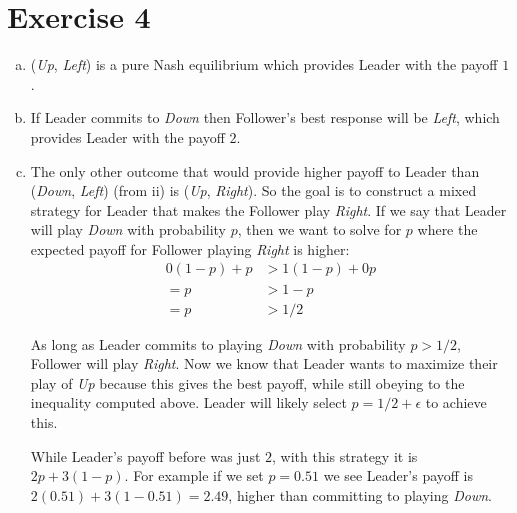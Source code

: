 \documentclass{article}
\begin{document}
\section*{Exercise 4}
\begin{enumerate}[a.]
    \item %
    (\emph{Up}, \emph{Left}) is a pure Nash equilibrium which provides Leader with the payoff $1$.

    \item %
    If Leader commits to \emph{Down} then Follower's best response will be \emph{Left}, which provides Leader with the payoff $2$.

    \item %
    The only other outcome that would provide higher payoff to Leader than (\emph{Down}, \emph{Left}) (from ii) is (\emph{Up}, \emph{Right}). So the goal is to construct a mixed strategy for Leader that makes the Follower play \emph{Right}. If we say that Leader will play \emph{Down} with probability $p$, then we want to solve for $p$ where the expected payoff for Follower playing \emph{Right} is higher:
    \begin{align*}
        0(1 - p) + p &> 1(1 - p) + 0p \\
        = p &> 1 - p \\
        = p &> 1/2
    \end{align*}

    As long as Leader commits to playing \emph{Down} with probability $p > 1/2$, Follower will play \emph{Right}. Now we know that Leader wants to maximize their play of \emph{Up} because this gives the best payoff, while still obeying to the inequality computed above. Leader will likely select $p = 1/2 + \epsilon$ to achieve this.

    While Leader's payoff before was just $2$, with this strategy it is $2p + 3(1 - p)$. For example if we set $p = 0.51$ we see Leader's payoff is $2(0.51) + 3(1 - 0.51) = 2.49$, higher than committing to playing \emph{Down}.
\end{enumerate}
\end{document}
